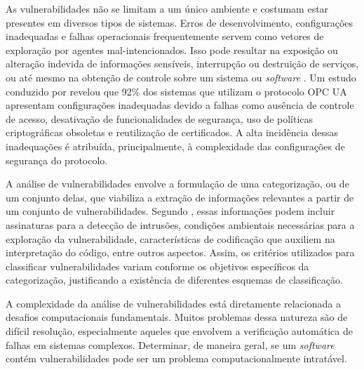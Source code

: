         As vulnerabilidades não se limitam a um único ambiente e costumam estar presentes em diversos tipos de sistemas. Erros de desenvolvimento, configurações inadequadas e falhas operacionais frequentemente servem como vetores de exploração por agentes mal-intencionados. Isso pode resultar na exposição ou alteração indevida de informações sensíveis, interrupção ou destruição de serviços, ou até mesmo na obtenção de controle sobre um sistema ou \textit{software} \cite{dowd2006}. Um estudo conduzido por  revelou que 92\% dos sistemas que utilizam o protocolo OPC UA apresentam configurações inadequadas devido a falhas como ausência de controle de acesso, desativação de funcionalidades de segurança, uso de políticas criptográficas obsoletas e reutilização de certificados. A alta incidência dessas inadequações é atribuída, principalmente, à complexidade das configurações de segurança do protocolo.
            
        A análise de vulnerabilidades envolve a formulação de uma categorização, ou de um conjunto delas, que viabiliza a extração de informações relevantes a partir de um conjunto de vulnerabilidades. Segundo , essas informações podem incluir assinaturas para a detecção de intrusões, condições ambientais necessárias para a exploração da vulnerabilidade, características de codificação que auxiliem na interpretação do código, entre outros aspectos. Assim, os critérios utilizados para classificar vulnerabilidades variam conforme os objetivos específicos da categorização, justificando a existência de diferentes esquemas de classificação.
    

        A complexidade da análise de vulnerabilidades está diretamente relacionada a desafios computacionais fundamentais. Muitos problemas dessa natureza são de difícil resolução, especialmente aqueles que envolvem a verificação automática de falhas em sistemas complexos. Determinar, de maneira geral, se um \textit{software} contém vulnerabilidades pode ser um problema computacionalmente intratável.

